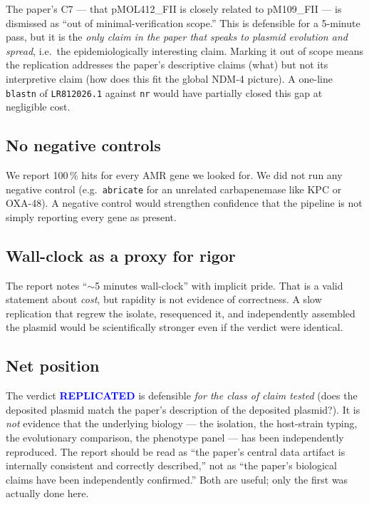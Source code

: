 \documentclass[11pt,a4paper]{article}
\newcommand{\verdict}[1]{\textbf{\textcolor{blue}{#1}}}
\begin{document}
The paper's C7 --- that pMOL412\_FII is closely related to
pM109\_FII --- is dismissed as ``out of minimal-verification scope.''
This is defensible for a 5-minute pass, but it is the \emph{only claim
in the paper that speaks to plasmid evolution and spread}, i.e.\ the
epidemiologically interesting claim. Marking it out of scope means the
replication addresses the paper's descriptive claims (what) but not
its interpretive claim (how does this fit the global NDM-4 picture).
A one-line \texttt{blastn} of \texttt{LR812026.1} against \texttt{nr}
would have partially closed this gap at negligible cost.

\subsection*{No negative controls}

We report 100\,\% hits for every AMR gene we looked for. We did not run
any negative control (e.g.\ \texttt{abricate} for an unrelated
carbapenemase like KPC or OXA-48). A negative control would strengthen
confidence that the pipeline is not simply reporting every gene as
present.

\subsection*{Wall-clock as a proxy for rigor}

The report notes ``$\sim$5 minutes wall-clock'' with implicit pride.
That is a valid statement about \emph{cost}, but rapidity is not
evidence of correctness. A slow replication that regrew the isolate,
resequenced it, and independently assembled the plasmid would be
scientifically stronger even if the verdict were identical.

\subsection*{Net position}

The verdict \verdict{REPLICATED} is defensible \emph{for the class of
claim tested} (does the deposited plasmid match the paper's description
of the deposited plasmid?). It is \emph{not} evidence that the
underlying biology --- the isolation, the host-strain typing, the
evolutionary comparison, the phenotype panel --- has been independently
reproduced. The report should be read as ``the paper's central data
artifact is internally consistent and correctly described,'' not as
``the paper's biological claims have been independently confirmed.''
Both are useful; only the first was actually done here.
\end{document}
